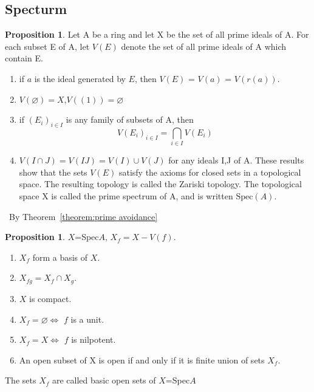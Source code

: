 \documentclass[a4paper,12pt]{article}
\newenvironment{prooff}{{\noindent\it\textcolor{cyan!40!black}{Proof}:}\,}{\par}
\theoremstyle{definition}
\newtheorem{prop}[defn]{Proposition}
\begin{document}
\subsection{Specturm}
\begin{prop}
    Let A be a ring and let X be the set of all prime ideals of A. For each subset
    E of A, let $V(E)$ denote the set of all prime ideals of A which contain E.
    \begin{enumerate}[(1)]
        \item if $a$ is the ideal generated by $E$, then $V(E)$ = $V(a)$ = $V(r(a))$.

        \item $V(\varnothing)=X$,$V((1))=\varnothing $

        \item if $(E_i)_{i\in I}$ is any family of subsets of A, then
              \begin{equation*}
                  V(E_i)_{i\in I}=\bigcap_{i\in I} V(E_i)
              \end{equation*}

        \item $V(I\cap J) = V(IJ) = V(I)\cup V(J)$ for any ideals I,J of A.
              These results show that the sets $V(E)$ satisfy the axioms for closed sets
              in a topological space. The resulting topology is called the Zariski topology.
              The topological space X is called the prime spectrum of A, and is written $\text{Spec}(A)$.
    \end{enumerate}

\end{prop}
\begin{prooff}
    By Theorem~\ref{theorem:prime avoidance}
\end{prooff}
\begin{prop}
    $X$=Spec$A$, $X_f=X-V(f)$.
    \begin{enumerate}[(1)]
        \item $X_f$ form a basis of $X$.
        \item $X_{fg}=X_f\cap X_g$.
        \item $X$ is compact.
        \item $X_f=\varnothing \Leftrightarrow$ $f$ is a unit.
        \item $X_f=X \Leftrightarrow $ $f$ is nilpotent.
        \item An open subset of X is open if and only if it is finite union of sets $X_f$.
    \end{enumerate}
    The sets $X_f$ are called basic open sets of $X$=Spec$A$
\end{prop}
\end{document}

